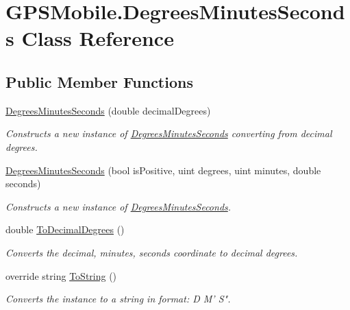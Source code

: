 \hypertarget{class_g_p_s_mobile_1_1_degrees_minutes_seconds}{
\section{GPSMobile.DegreesMinutesSeconds Class Reference}
\label{class_g_p_s_mobile_1_1_degrees_minutes_seconds}
}
\subsection*{Public Member Functions}
\begin{DoxyCompactItemize}
\item 
\hyperlink{class_g_p_s_mobile_1_1_degrees_minutes_seconds_a5a0359c380dd9ab77197dde6b75a062c}{DegreesMinutesSeconds} (double decimalDegrees)
\begin{DoxyCompactList}\small\item\em Constructs a new instance of \hyperlink{class_g_p_s_mobile_1_1_degrees_minutes_seconds}{DegreesMinutesSeconds} converting from decimal degrees. \item\end{DoxyCompactList}\item 
\hyperlink{class_g_p_s_mobile_1_1_degrees_minutes_seconds_a0beba9ff11f3b84a2604a3f78ef6da99}{DegreesMinutesSeconds} (bool isPositive, uint degrees, uint minutes, double seconds)
\begin{DoxyCompactList}\small\item\em Constructs a new instance of \hyperlink{class_g_p_s_mobile_1_1_degrees_minutes_seconds}{DegreesMinutesSeconds}. \item\end{DoxyCompactList}\item 
double \hyperlink{class_g_p_s_mobile_1_1_degrees_minutes_seconds_a114de0a66d178c5af760e29119d1c725}{ToDecimalDegrees} ()
\begin{DoxyCompactList}\small\item\em Converts the decimal, minutes, seconds coordinate to decimal degrees. \item\end{DoxyCompactList}\item 
override string \hyperlink{class_g_p_s_mobile_1_1_degrees_minutes_seconds_a164a4704ff73cbeb937d43aded782c99}{ToString} ()
\begin{DoxyCompactList}\small\item\em Converts the instance to a string in format: D M' S". \item\end{DoxyCompactList}\end{DoxyCompactItemize}
